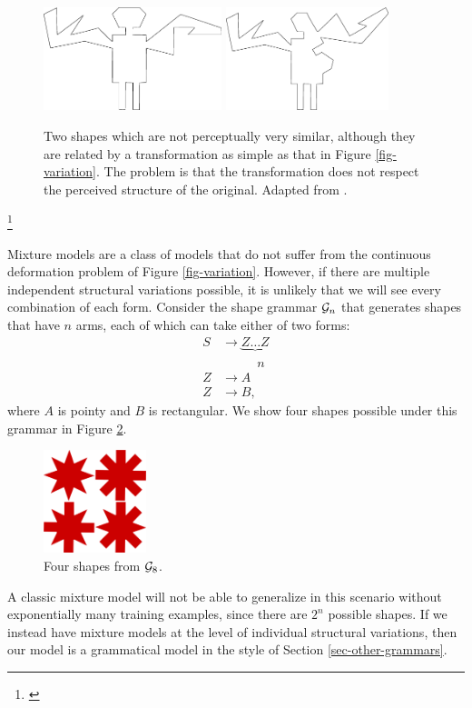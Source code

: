 \begin{figure}[h]
\centering
\includegraphics[height=30mm]{images/basri_original.png} 
\includegraphics[height=30mm]{images/basri_variation_bad.png} 
\caption{Two shapes which are not perceptually very similar, although
  they are related by a transformation as simple as that in Figure
  \ref{fig-variation}. The problem is that the transformation does not
  respect the perceived structure of the original. Adapted from
  .}
\label{fig-badvariation}
\end{figure}
\footnote{\cite{basri-jacobs}}

Mixture models are a class of models that do not suffer from the
continuous deformation problem of Figure \ref{fig-variation}. However,
if there are multiple independent structural variations possible, it
is unlikely that we will see every combination of each form.  Consider
the shape grammar ${\mathcal G}_n$ that generates shapes that have $n$ arms,
each of which can take either of two forms:
\begin{align*}
S&\to \underbrace{Z\dots Z}\\
&\phantom{\to Z ..}n\\
Z &\to A\\
Z &\to B,
\end{align*}
where $A$ is pointy and $B$ is rectangular. We show four shapes
possible under this grammar in Figure \ref{fig-narms}. 
\begin{figure}[h]
\centering
\includegraphics[height=30mm]{images/narms.png} 
\caption{Four shapes from ${\mathcal G}_8$.}
\label{fig-narms}
\end{figure}
A classic mixture model will not be able to generalize in this
scenario without exponentially many training examples, since there
are $2^n$ possible shapes. If we instead have mixture models at the
level of individual structural variations, then our model is a
grammatical model in the style of Section \ref{sec-other-grammars}.


